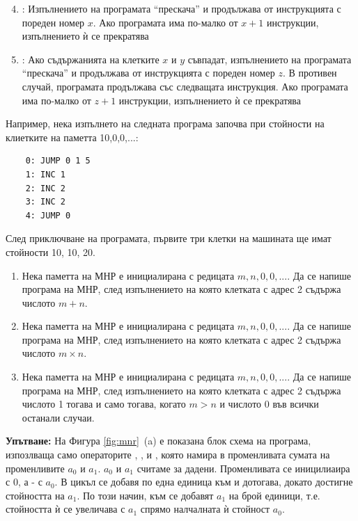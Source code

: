 {\begin{mdframed}[hidealllines=true,backgroundcolor=gray!20]
	\begin{enumerate}[label=\arabic*)]
	\setcounter{enumi}{3}
		\item {}: Изпълнението на програмата ``прескача'' и продължава от инструкцията с пореден номер $x$. Ако програмата има по-малко от $x+1$ инструкции, изпълнението ѝ се прекратява
		\item {}: Ако съдържанията на клетките  $x$ и $y$ съвпадат, изпълнението на програмата ``прескача'' и продължава от инструкцията с пореден номер $z$. В противен случай, програмата продължава със следващата инструкция. Ако програмата има по-малко от $z+1$ инструкции, изпълнението ѝ се прекратява
	\end{enumerate}

	Например, нека изпълнето на следната програма започва при стойности на клиетките на паметта 10,0,0,...:

	\begin{verbatim}
	0: JUMP 0 1 5
	1: INC 1
	2: INC 2
	3: INC 2
	4: JUMP 0
	\end{verbatim}

	След приключване на програмата, първите три клетки на машината ще имат стойности 10, 10, 20.

\end{mdframed}

\begin{enumerate}[resume]
	\item Нека паметта на МНР е инициалирана с редицата $m,n,0,0,...$. Да се напише програма на МНР, след изпълнението на която клетката с адрес 2 съдържа числото $m+n$.
	\item Нека паметта на МНР е инициалирана с редицата $m,n,0,0,...$. Да се напише програма на МНР, след изпълнението на която клетката с адрес 2 съдържа числото $m \times n$.
	\item Нека паметта на МНР е инициалирана с редицата $m,n,0,0,...$. Да се напише програма на МНР, след изпълнението на която клетката с адрес 2 съдържа числото 1 тогава и само тогава, когато $m>n$ и числото 0 във всички останали случаи.
\end{enumerate}

\begin{mdframed}[hidealllines=true,backgroundcolor=gray!20]
\textbf{Упътване:} На Фигура \ref{fig:mnr}~(a) е показана блок схема на програма, изпозлваща само операторите \code{=}, \code{==}, \code{++} и , която намира в променливата  сумата на променливите $a_0$ и $a_1$. $a_0$ и $a_1$ считаме за дадени. Променливата  се иницилиаира с 0, а  - с $a_0$. В цикъл се добавя по една единица към  и  дотогава, докато  достигне стойността на $a_1$. По този начин, към  се добавят $a_1$ на брой единици, т.е. стойността ѝ се увеличава с $a_1$ спрямо налчалната ѝ стойност $a_0$.


\end{mdframed}}
